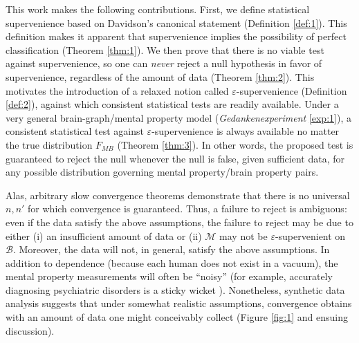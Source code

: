 \documentclass{article}
\newcommand{\eps}{\varepsilon}
\providecommand{\mc}[1]{\mathcal{#1}}
\begin{document}

This work makes the following contributions.  First, we define statistical supervenience based on Davidson's canonical statement (Definition \ref{def:1}).  This definition makes it apparent that supervenience implies the possibility of perfect classification (Theorem \ref{thm:1}).  
We then prove that there is no viable test against supervenience, so one can \emph{never} reject a null hypothesis in favor of supervenience, regardless of the amount of data (Theorem \ref{thm:2}).  This motivates the introduction of a relaxed notion called $\eps$-supervenience (Definition \ref{def:2}), against which consistent statistical tests are readily available. Under a very general brain-graph/mental property model (\emph{Gedankenexperiment} \ref{exp:1}),  a consistent statistical test against $\eps$-supervenience is always available no matter the true distribution $F_{MB}$ (Theorem \ref{thm:3}).  
In other words, the proposed test is guaranteed to reject the null whenever the null is false, given sufficient data, for any possible distribution governing mental property/brain property pairs. 

Alas, arbitrary slow convergence theorems demonstrate that there is no universal $n,n'$ for which convergence is guaranteed.  Thus, a failure to reject is ambiguous: even if the data satisfy the above assumptions, the failure to reject may be due to either (i) an insufficient amount of data or (ii) $\mc{M}$ may not be $\eps$-supervenient on $\mc{B}$.  Moreover, the data will not, in general, satisfy the above assumptions.  In addition to dependence (because each human does not exist in a vacuum), the mental property measurements will often be ``noisy'' (for example, accurately diagnosing psychiatric disorders is a sticky wicket \cite{Kessler2005}). 
% 
Nonetheless, synthetic data analysis suggests that under somewhat realistic assumptions, convergence obtains with an amount of data one might conceivably collect (Figure \ref{fig:1} and ensuing discussion).  
\end{document}
